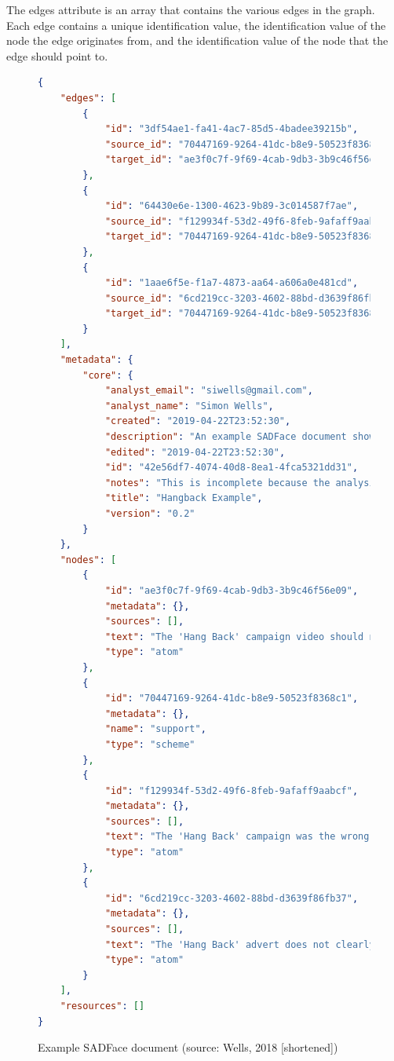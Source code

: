 \documentclass[12pt,a4paper]{article}
\begin{document}
The edges attribute is an array that contains the various edges in the graph. Each edge contains a unique identification value, the identification value of the node the edge originates from, and the identification value of the node that the edge should point to.

\begin{figure}[H]
    \centering
\begin{lstlisting}[language=json,firstnumber=1]
{
    "edges": [
        {
            "id": "3df54ae1-fa41-4ac7-85d5-4badee39215b",
            "source_id": "70447169-9264-41dc-b8e9-50523f8368c1",
            "target_id": "ae3f0c7f-9f69-4cab-9db3-3b9c46f56e09"
        },
        {
            "id": "64430e6e-1300-4623-9b89-3c014587f7ae",
            "source_id": "f129934f-53d2-49f6-8feb-9afaff9aabcf",
            "target_id": "70447169-9264-41dc-b8e9-50523f8368c1"
        },
        {
            "id": "1aae6f5e-f1a7-4873-aa64-a606a0e481cd",
            "source_id": "6cd219cc-3203-4602-88bd-d3639f86fb37",
            "target_id": "70447169-9264-41dc-b8e9-50523f8368c1"
        }
    ],
    "metadata": {
        "core": {
            "analyst_email": "siwells@gmail.com",
            "analyst_name": "Simon Wells",
            "created": "2019-04-22T23:52:30",
            "description": "An example SADFace document showing an argument analysis of the Hangback cycle safety campaign from the STCD corpora.",
            "edited": "2019-04-22T23:52:30",
            "id": "42e56df7-4074-40d8-8ea1-4fca5321dd31",
            "notes": "This is incomplete because the analysis in Pangbourne & Wells (2018) has much more argumenative content.",
            "title": "Hangback Example",
            "version": "0.2"
        }
    },
    "nodes": [
        {
            "id": "ae3f0c7f-9f69-4cab-9db3-3b9c46f56e09",
            "metadata": {},
            "sources": [],
            "text": "The 'Hang Back' campaign video should not have been published, and should be withdrawn.",
            "type": "atom"
        },
        {
            "id": "70447169-9264-41dc-b8e9-50523f8368c1",
            "metadata": {},
            "name": "support",
            "type": "scheme"
        },
        {
            "id": "f129934f-53d2-49f6-8feb-9afaff9aabcf",
            "metadata": {},
            "sources": [],
            "text": "The 'Hang Back' campaign was the wrong campaign to run",
            "type": "atom"
        },
        {
            "id": "6cd219cc-3203-4602-88bd-d3639f86fb37",
            "metadata": {},
            "sources": [],
            "text": "The 'Hang Back' advert does not clearly express the intended message",
            "type": "atom"
        }
    ],
    "resources": []
}
\end{lstlisting}
    \caption{Example SADFace document (source: Wells, 2018 [shortened])}
    \label{fig:sadfaceexample}
\end{figure}
\end{document}
